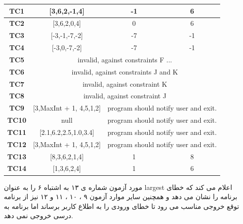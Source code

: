 \documentclass[twoside]{article}
\newenvironment{answer}{}{\medskip}
\begin{document}
\begin{answer}
\begin{table}[h]
\begin{latin}
\begin{tabular}{c|c|c|c|}
\multicolumn{1}{|c|}{\textbf{TC1}}  & {[}3,6,2,-1,4{]}            & -1                           & 6                          \\ \hline
\multicolumn{1}{|c|}{\textbf{TC2}}  & {[}3,6,2,0,4{]}             & 0                            & 6                          \\ \hline
\multicolumn{1}{|c|}{\textbf{TC3}}  & {[}-3,-1,-7,-2{]}           & -7                           & -1                         \\ \hline
\multicolumn{1}{|c|}{\textbf{TC4}}  & {[}-3,0,-7,-2{]}            & -7                           & -1                         \\ \hline
\multicolumn{1}{|c|}{\textbf{TC5}}  & \multicolumn{3}{c|}{invalid, against constraints F ...}                                 \\ \hline
\multicolumn{1}{|c|}{\textbf{TC6}}  & \multicolumn{3}{c|}{invalid, against constraints J and K}                               \\ \hline
\multicolumn{1}{|c|}{\textbf{TC7}}  & \multicolumn{3}{c|}{invalid, against constraint K}                                      \\ \hline
\multicolumn{1}{|c|}{\textbf{TC8}}  & \multicolumn{3}{c|}{invalid, against constraint J}                                      \\ \hline
\multicolumn{1}{|c|}{\textbf{TC9}}  & {[}3,MaxInt + 1, 4,5,1,2{]} & \multicolumn{2}{c|}{program should notify user and exit.} \\ \hline
\multicolumn{1}{|c|}{\textbf{TC10}} & null                        & \multicolumn{2}{c|}{program should notify user and exit.} \\ \hline
\multicolumn{1}{|c|}{\textbf{TC11}} & {[}2.1,6.2,2.5,1.0,3.4{]}   & \multicolumn{2}{c|}{program should notify user and exit.} \\ \hline
\multicolumn{1}{|c|}{\textbf{TC12}} & {[}3,MaxInt + 1, 4,5,1,2{]} & \multicolumn{2}{c|}{program should notify user and exit.} \\ \hline
\multicolumn{1}{|c|}{\textbf{TC13}} & {[}8,3,6,2,1,4{]}           & 1                            & 8                          \\ \hline
\multicolumn{1}{|c|}{\textbf{TC14}} & {[}1,3,6,2,4{]}             & 1                            & 6                          \\ \hline
	\end{tabular}
	\end{latin}
	\end{table}
مورد آزمون شماره ی ۱۳ به اشتباه ۶ را به عنوان largest اعلام می کند که خطای برنامه را نشان می دهد و همچنین سایر موارد آزمون ۹ ، ۱۰ ، ۱۱ و ۱۲ نیز از برنامه توقع خروجی مناسب می رود تا خطای ورودی را به اطلاع کاربر برساند اما برنامه به درسی خروجی نمی دهد.
\end{answer}
\end{document}
